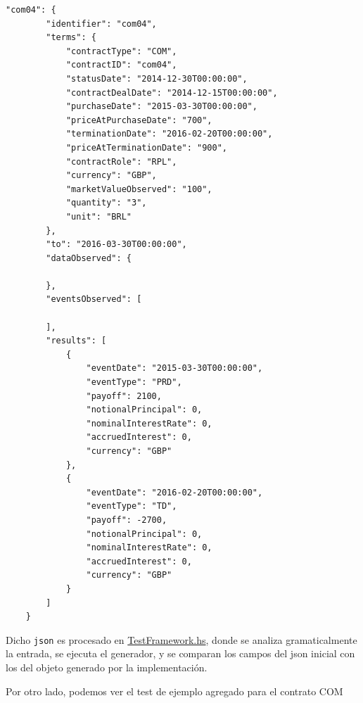 \documentclass[12pt]{book}
\begin{document}
\begin{lstlisting}[style=Haskell-cardano, caption=Test propuesto por ACTUS para el contrato COM. Se pueden ovservar tanto los términos como eventos observados y los eventos que se esperá que la implementación genere.]
"com04": {
        "identifier": "com04",
        "terms": {
            "contractType": "COM",
            "contractID": "com04",
            "statusDate": "2014-12-30T00:00:00",
            "contractDealDate": "2014-12-15T00:00:00",
            "purchaseDate": "2015-03-30T00:00:00",
            "priceAtPurchaseDate": "700",
            "terminationDate": "2016-02-20T00:00:00",
            "priceAtTerminationDate": "900",
            "contractRole": "RPL",
            "currency": "GBP",
            "marketValueObserved": "100",
            "quantity": "3",
            "unit": "BRL"
        },
        "to": "2016-03-30T00:00:00",
        "dataObserved": {

        },
        "eventsObserved": [

        ],
        "results": [
            {
                "eventDate": "2015-03-30T00:00:00",
                "eventType": "PRD",
                "payoff": 2100,
                "notionalPrincipal": 0,
                "nominalInterestRate": 0,
                "accruedInterest": 0,
                "currency": "GBP"
            },
            {
                "eventDate": "2016-02-20T00:00:00",
                "eventType": "TD",
                "payoff": -2700,
                "notionalPrincipal": 0,
                "nominalInterestRate": 0,
                "accruedInterest": 0,
                "currency": "GBP"
            }
        ]
    }
\end{lstlisting}

Dicho \texttt{json} es procesado en \href{https://github.com/input-output-hk/marlowe-cardano/blob/main/marlowe-actus/test/Spec/Marlowe/ACTUS/TestFramework.hs}{TestFramework.hs}, donde se analiza gramaticalmente la entrada, se ejecuta el generador, y se comparan los campos del json inicial con los del objeto generado por la implementación.

Por otro lado, podemos ver el test de ejemplo agregado para el contrato COM 
\end{document}
